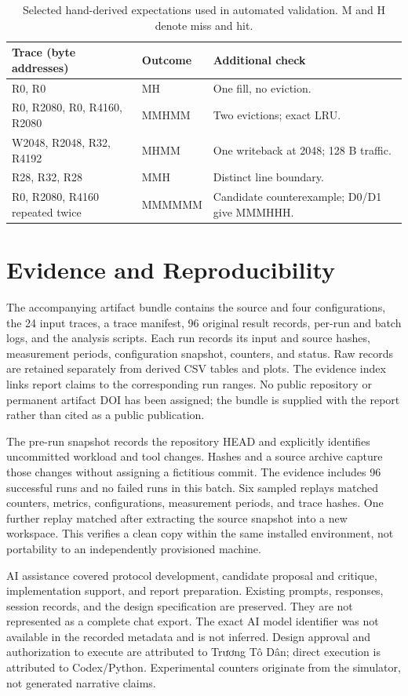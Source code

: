 \documentclass[11pt,a4paper]{article}
\begin{document}
\begin{table}[htbp]\centering\small
\caption{Selected hand-derived expectations used in automated validation. M and H denote miss and hit.}
\begin{tabularx}{\linewidth}{Y l Y}\toprule
Trace (byte addresses) & Outcome & Additional check\\\midrule
R0, R0 & MH & One fill, no eviction.\\
R0, R2080, R0, R4160, R2080 & MMHMM & Two evictions; exact LRU.\\
W2048, R2048, R32, R4192 & MHMM & One writeback at 2048; 128 B traffic.\\
R28, R32, R28 & MMH & Distinct line boundary.\\
R0, R2080, R4160 repeated twice & MMMMMM & Candidate counterexample; D0/D1 give MMMHHH.\\\bottomrule
\end{tabularx}
\end{table}

\section{Evidence and Reproducibility}
The accompanying artifact bundle contains the source and four configurations, the 24 input traces, a trace manifest, 96 original result records, per-run and batch logs, and the analysis scripts. Each run records its input and source hashes, measurement periods, configuration snapshot, counters, and status. Raw records are retained separately from derived CSV tables and plots. The evidence index links report claims to the corresponding run ranges. No public repository or permanent artifact DOI has been assigned; the bundle is supplied with the report rather than cited as a public publication.

The pre-run snapshot records the repository HEAD and explicitly identifies uncommitted workload and tool changes. Hashes and a source archive capture those changes without assigning a fictitious commit. The evidence includes 96 successful runs and no failed runs in this batch. Six sampled replays matched counters, metrics, configurations, measurement periods, and trace hashes. One further replay matched after extracting the source snapshot into a new workspace. This verifies a clean copy within the same installed environment, not portability to an independently provisioned machine.



AI assistance covered protocol development, candidate proposal and critique, implementation support, and report preparation. Existing prompts, responses, session records, and the design specification are preserved. They are not represented as a complete chat export. The exact AI model identifier was not available in the recorded metadata and is not inferred. Design approval and authorization to execute are attributed to Trương Tô Dân; direct execution is attributed to Codex/Python. Experimental counters originate from the simulator, not generated narrative claims.
\end{document}
